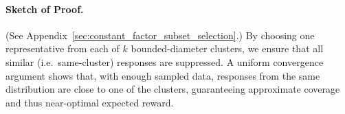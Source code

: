 \vspace{-0.15in}
\paragraph{Sketch of Proof.}
(See Appendix~\ref{sec:constant_factor_subset_selection}.) By choosing one representative from each of $k$ bounded-diameter clusters, we ensure that all similar (i.e.\ same-cluster) responses are suppressed. A uniform convergence argument shows that, with enough sampled data, responses from the same distribution are close to one of the clusters, guaranteeing approximate coverage and thus near-optimal expected reward.



\begin{table*}[!tb]
\centering
{}
\caption{Comparison of various preference optimization baselines on AlpacaEval, Arena-Hard, and MT-Bench benchmarks for Llama-3-Instruct (8B). LC-WR represents length-controlled win rate, and WR represents raw win rate. Best results are in \textbf{bold}, second-best are \underline{underlined}. Our method ($\ampo$) achieves SOTA performance across all metrics, with different variants achieving either best or second-best results consistently.}
\label{tab:llama3-results}
\end{table*}


